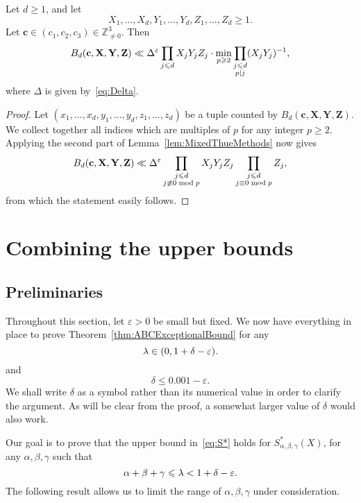 \begin{proposition} \label{prop:ThueEquations}
Let $d\geq 1$, and let
\[
X_1,\ldots, X_d, Y_1,\ldots, Y_d,Z_1,\ldots, Z_d\geq 1.
\]
Let $\mathbf{c}\in (c_1,c_2,c_3)\in \mathbb{Z}_{\neq 0}^3$.
Then
\[
B_d(\mathbf{c},\mathbf{X},\mathbf{Y},\mathbf{Z}) \ll
\Delta^\varepsilon \prod_{j\leqslant d} X_j Y_j Z_j \cdot
\min_{p\geqslant 2}
\prod_{\substack{j\leqslant d \\ p\mid j}} (X_j Y_j)^{-1},
\]
where $\Delta$ is given by~\eqref{eq:Delta}.
\end{proposition}
\begin{proof}
Let $(x_1,\ldots, x_d,y_1,\ldots, y_d,z_1,\ldots, z_d)$ be a tuple counted by $B_d(\mathbf{c},\mathbf{X},\mathbf{Y},\mathbf{Z})$.
We collect together all indices which are multiples of $p$ for any integer $p\geq 2$.
Applying the second part of Lemma~\ref{lem:MixedThueMethods} now gives
\[
B_d(\mathbf{c},\mathbf{X},\mathbf{Y},\mathbf{Z}) \ll
\Delta^\varepsilon \prod_{\substack{j\leqslant d\\ j\not\equiv 0 \bmod{p} }} X_j Y_j Z_j
 \prod_{\substack{j\leqslant d\\ j\equiv 0 \bmod{p} }} Z_j,
\]
from which the statement easily follows.
\end{proof}



\chapter{Combining the upper bounds }

\section{Preliminaries}

Throughout this section, let $\varepsilon>0$ be small but fixed.
We now have everything in place to prove Theorem~\ref{thm:ABCExceptionalBound} for any
\[
\lambda\in (0,1+\delta-\varepsilon).
\]
and
\[\delta\le 0.001-\varepsilon.\]
We shall write $\delta$ as a symbol rather than its numerical value
in order to clarify the argument. As will be clear from the proof, a somewhat larger value of $\delta$ would also work.

Our goal is to prove that the upper bound in~\eqref{eq:S*} holds for $S^{*}_{\alpha,\beta,\gamma}(X)$,
for any $\alpha,\beta,\gamma$ such that
\begin{equation}\label{eq:goat}
\alpha+\beta+\gamma\leqslant \lambda < 1+\delta -\varepsilon.
\end{equation}
The following result allows us to limit the range of $\alpha,\beta,\gamma$ under consideration.


